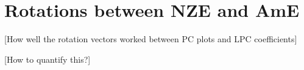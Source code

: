 \section{Rotations between NZE and AmE}

[How well the rotation vectors worked between PC plots and LPC coefficients]

[How to quantify this?]

